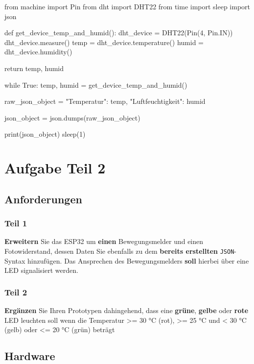\documentclass[18pt]{article}
\begin{document}
\begin{python}
from machine import Pin
from dht import DHT22
from time import sleep
import json

def get_device_temp_and_humid():
	dht_device = DHT22(Pin(4, Pin.IN))
	dht_device.measure()
	temp = dht_device.temperature()
	humid = dht_device.humidity()

	return temp, humid

while True:
	temp, humid = get_device_temp_and_humid()

	raw_json_object = {
		"Temperatur": temp,
		"Luftfeuchtigkeit": humid
	}

	json_object = json.dumps(raw_json_object)

	print(json_object)
	sleep(1)
\end{python}
\newpage
\section{Aufgabe Teil 2}
\subsection{Anforderungen}
\subsubsection{Teil 1}
\textbf{Erweitern} Sie das ESP32 um \textbf{einen} Bewegungsmelder und einen 
Fotowiderstand, dessen Daten Sie ebenfalls zu dem \textbf{bereits erstellten} \texttt{JSON}-Syntax hinzufügen. Das Ansprechen des Bewegungsmelders \textbf{soll} hierbei über 
eine LED signalisiert werden.

\subsubsection{Teil 2}
\textbf{Ergänzen} Sie Ihren Prototypen dahingehend, dass eine \textbf{grüne}, \textbf{gelbe} oder \textbf{rote}
LED leuchten soll wenn die Temperatur >= 30 °C (rot), >= 25 °C und < 30 °C
(gelb) oder <= 20 °C (grün) beträgt

\subsection{Hardware}
\end{document}
